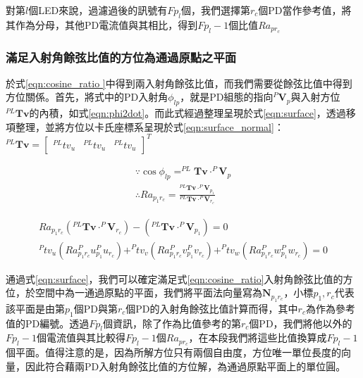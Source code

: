        對第$l$個LED來說，過濾過後的訊號有$Fp_l$個，我們選擇第$r_c$個PD當作參考值，將其作為分母，其他PD電流值與其相比，得到$Fp_l-1$個比值$Ra_{pr_c}$

    \subsubsection{滿足入射角餘弦比值的方位為通過原點之平面}
    \label{chp:solve_surface}
        
        於式\ref{eqn:cosine_ratio
        }中得到兩入射角餘弦比值，而我們需要從餘弦比值中得到方位關係。首先，將式中的PD入射角$\phi_{lp}$，就是PD組態的指向$^P\boldsymbol{V}_p$與入射方位$^{PL}\boldsymbol{Tv}$的內積，如式\ref{eqn:phi2dot}。而此式經過整理呈現於式\ref{eqn:surface}，透過移項整理，並將方位以卡氏座標系呈現於式\ref{eqn:surface_normal}：$^{PL}\boldsymbol{Tv}=\left[\begin{array}{ccc}^{PL}tv_u&^{PL}tv_u&^{PL}tv_u\end{array}\right]^T$

        \begin{equation}
            \label{eqn:phi2dot}
            \begin{aligned}
                \because \cos\phi_{lp} = ^{PL}\boldsymbol{Tv}\cdot^P\boldsymbol{V}_p\\
                \therefore Ra_{p_1r_c}
                =\frac{^{PL}\boldsymbol{Tv}\cdot^P\boldsymbol{V}_{p_1}}{^{PL}\boldsymbol{Tv}\cdot^P\boldsymbol{V}_{r_c}}
            \end{aligned}
        \end{equation}
            
            \begin{gather}
                \label{eqn:surface}
                 Ra_{p_1r_c}({^{PL}\boldsymbol{Tv}\cdot^P\boldsymbol{V}_{r_c}})-({^{PL}\boldsymbol{Tv}\cdot^P\boldsymbol{V}_{p_1}})=0\\
                 \label{eqn:surface_normal}
                 ^{P}tv_u(Ra_{p_1r_c}^{P}u_{p_1}^{P}u_{r_c})
                 +^{P}tv_v(Ra_{p_1r_c}^{P}v_{p_1}^{P}v_{r_c})
                 +^{P}tv_w(Ra_{p_1r_c}^{P}w_{p_1}^{P}w_{r_c})=0
            \end{gather}

        通過式\ref{eqn:surface}，我們可以確定滿足式\ref{eqn:cosine_ratio}入射角餘弦比值的方位，於空間中為一通過原點的平面，我們將平面法向量寫為$\boldsymbol{N}_{p_1r_c}$，小標$p_1,r_c$代表該平面是由第$p_1$個PD與第$r_c$個PD的入射角餘弦比值計算而得，其中$r_c$為作為參考值的PD編號。透過$Fp_l$個資訊，除了作為比值參考的第$r_c$個PD，我們將他以外的$Fp_l-1$個電流值與其比較得$Fp_l-1$個$Ra_{pr_c}$，在本段我們將這些比值換算成$Fp_l-1$個平面。值得注意的是，因為所解方位只有兩個自由度，方位唯一單位長度的向量，因此符合藉兩PD入射角餘弦比值的方位解，為通過原點平面上的單位圓。



